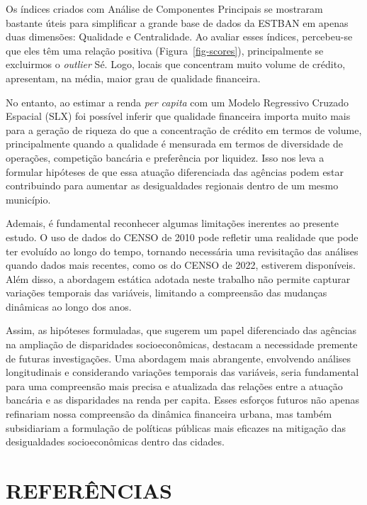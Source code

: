\documentclass[a4paper,12pt]{article}
\begin{document}
Os índices criados com Análise de Componentes Principais se mostraram
bastante úteis para simplificar a grande base de dados da ESTBAN em
apenas duas dimensões: Qualidade e Centralidade. Ao avaliar esses
índices, percebeu-se que eles têm uma relação positiva
(Figura~\ref{fig-scores}), principalmente se excluirmos o \emph{outlier}
Sé. Logo, locais que concentram muito volume de crédito, apresentam, na
média, maior grau de qualidade financeira.

No entanto, ao estimar a renda \emph{per capita} com um Modelo
Regressivo Cruzado Espacial (SLX) foi possível inferir que qualidade
financeira importa muito mais para a geração de riqueza do que a
concentração de crédito em termos de volume, principalmente quando a
qualidade é mensurada em termos de diversidade de operações, competição
bancária e preferência por liquidez. Isso nos leva a formular hipóteses
de que essa atuação diferenciada das agências podem estar contribuindo
para aumentar as desigualdades regionais dentro de um mesmo município.

Ademais, é fundamental reconhecer algumas limitações inerentes ao
presente estudo. O uso de dados do CENSO de 2010 pode refletir uma
realidade que pode ter evoluído ao longo do tempo, tornando necessária
uma revisitação das análises quando dados mais recentes, como os do
CENSO de 2022, estiverem disponíveis. Além disso, a abordagem estática
adotada neste trabalho não permite capturar variações temporais das
variáveis, limitando a compreensão das mudanças dinâmicas ao longo dos
anos.

Assim, as hipóteses formuladas, que sugerem um papel diferenciado das
agências na ampliação de disparidades socioeconômicas, destacam a
necessidade premente de futuras investigações. Uma abordagem mais
abrangente, envolvendo análises longitudinais e considerando variações
temporais das variáveis, seria fundamental para uma compreensão mais
precisa e atualizada das relações entre a atuação bancária e as
disparidades na renda per capita. Esses esforços futuros não apenas
refinariam nossa compreensão da dinâmica financeira urbana, mas também
subsidiariam a formulação de políticas públicas mais eficazes na
mitigação das desigualdades socioeconômicas dentro das cidades.

\newpage

\hypertarget{referuxeancias}{%
\section{REFERÊNCIAS}\label{referuxeancias}}
\end{document}
